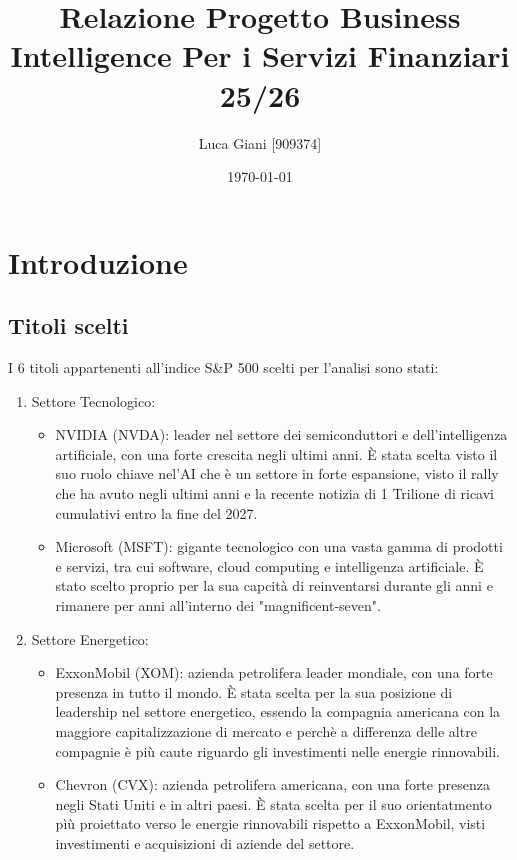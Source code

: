 \documentclass[11pt, a4paper]{report} %
\title{Relazione Progetto Business Intelligence Per i Servizi Finanziari 25/26}
\author{Luca Giani [909374]}
\date{\today}
\begin{document}
\maketitle %
\tableofcontents %

\chapter{Introduzione}

\section{Titoli scelti}

I 6 titoli appartenenti all'indice S\&P 500 scelti per l'analisi sono stati:
\begin{enumerate}
    \item Settore Tecnologico: 
    \begin{itemize}
        \item NVIDIA (NVDA): leader nel settore dei semiconduttori e dell'intelligenza artificiale, con una forte crescita negli ultimi anni. È stata scelta visto il suo ruolo chiave nel'AI che è un settore in forte espansione, visto il rally che ha avuto negli ultimi anni e la recente notizia di 1 Trilione di ricavi cumulativi entro la fine del 2027.
        \item Microsoft (MSFT): gigante tecnologico con una vasta gamma di prodotti e servizi, tra cui software, cloud computing e intelligenza artificiale. È stato scelto proprio per la sua capcità di reinventarsi durante gli anni e rimanere per anni all'interno dei "magnificent-seven".
    \end{itemize}
        
    \item Settore Energetico: 
    \begin{itemize}
        \item ExxonMobil (XOM): azienda petrolifera leader mondiale, con una forte presenza in tutto il mondo. È stata scelta per la sua posizione di leadership nel settore energetico, essendo la compagnia americana con la maggiore capitalizzazione di mercato e perchè a differenza delle altre compagnie è più caute riguardo gli investimenti nelle energie rinnovabili.
        \item Chevron (CVX): azienda petrolifera americana, con una forte presenza negli Stati Uniti e in altri paesi. È stata scelta per il suo orientatmento pìù proiettato verso le energie rinnovabili rispetto a ExxonMobil, visti investimenti e acquisizioni di aziende del settore.
    \end{itemize}


\end{enumerate}
\end{document}
